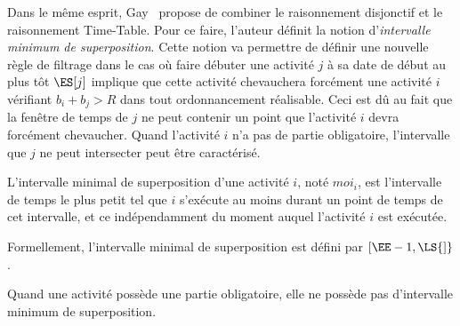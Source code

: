 Dans le même esprit, Gay~\cite{Gay2015} propose de combiner le
raisonnement disjonctif et le raisonnement Time-Table. Pour ce faire,
l'auteur définit la notion d'{\it intervalle minimum de
superposition}. Cette notion va permettre de définir une nouvelle
règle de filtrage dans le cas où faire débuter une activité $j$ à sa
date de début au plus tôt $\ES[j]$ implique que cette activité
chevauchera forcément une activité $i$ vérifiant $b_i+b_j > R$ dans
tout ordonnancement réalisable. Ceci est dû au fait que la fenêtre de
temps de $j$ ne peut contenir un point que l'activité $i$ devra
forcément chevaucher. Quand l'activité $i$ n'a pas de partie
obligatoire, l'intervalle que $j$ ne peut intersecter peut être
caractérisé.

\begin{defi}
\label{des:moi_CUSP} 
L'intervalle minimal de superposition d’une activité $i$, noté
$moi_i$, est l’intervalle de temps le plus petit tel que $i$ s’exécute
au moins durant un point de temps de cet intervalle, et ce
indépendamment du moment auquel l'activité $i$ est exécutée.  

Formellement,  l’intervalle minimal de superposition est défini par
$[\EE-1,\LS{]}$.
\end{defi}

Quand une activité possède une partie obligatoire, elle ne possède pas
d'intervalle minimum de superposition. 

